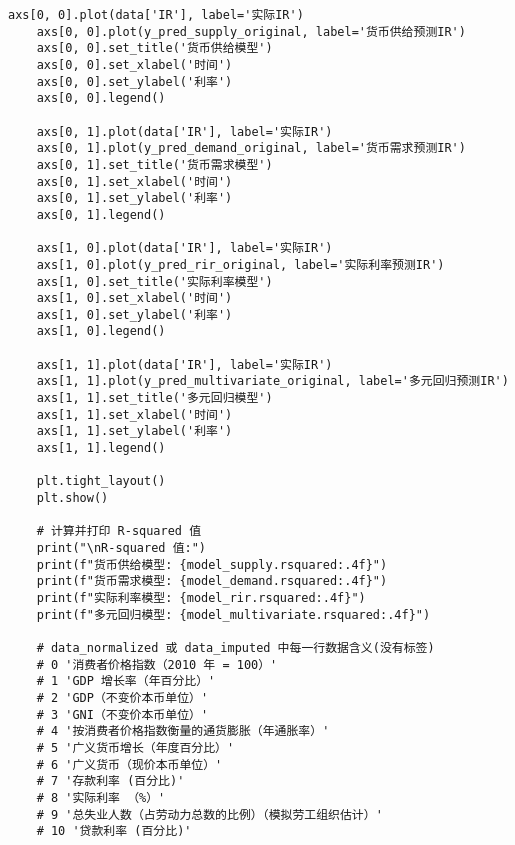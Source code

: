 \begin{lstlisting}[caption={问题二处理代码}]
	axs[0, 0].plot(data['IR'], label='实际IR')
	axs[0, 0].plot(y_pred_supply_original, label='货币供给预测IR')
	axs[0, 0].set_title('货币供给模型')
	axs[0, 0].set_xlabel('时间')
	axs[0, 0].set_ylabel('利率')
	axs[0, 0].legend()
	
	axs[0, 1].plot(data['IR'], label='实际IR')
	axs[0, 1].plot(y_pred_demand_original, label='货币需求预测IR')
	axs[0, 1].set_title('货币需求模型')
	axs[0, 1].set_xlabel('时间')
	axs[0, 1].set_ylabel('利率')
	axs[0, 1].legend()
	
	axs[1, 0].plot(data['IR'], label='实际IR')
	axs[1, 0].plot(y_pred_rir_original, label='实际利率预测IR')
	axs[1, 0].set_title('实际利率模型')
	axs[1, 0].set_xlabel('时间')
	axs[1, 0].set_ylabel('利率')
	axs[1, 0].legend()
	
	axs[1, 1].plot(data['IR'], label='实际IR')
	axs[1, 1].plot(y_pred_multivariate_original, label='多元回归预测IR')
	axs[1, 1].set_title('多元回归模型')
	axs[1, 1].set_xlabel('时间')
	axs[1, 1].set_ylabel('利率')
	axs[1, 1].legend()
	
	plt.tight_layout()
	plt.show()
	
	# 计算并打印 R-squared 值
	print("\nR-squared 值:")
	print(f"货币供给模型: {model_supply.rsquared:.4f}")
	print(f"货币需求模型: {model_demand.rsquared:.4f}")
	print(f"实际利率模型: {model_rir.rsquared:.4f}")
	print(f"多元回归模型: {model_multivariate.rsquared:.4f}")
	
	# data_normalized 或 data_imputed 中每一行数据含义(没有标签)
	# 0 '消费者价格指数（2010 年 = 100）'
	# 1 'GDP 增长率（年百分比）'
	# 2 'GDP（不变价本币单位）'
	# 3 'GNI（不变价本币单位）'
	# 4 '按消费者价格指数衡量的通货膨胀（年通胀率）'
	# 5 '广义货币增长（年度百分比）'
	# 6 '广义货币（现价本币单位）'
	# 7 '存款利率 (百分比)'
	# 8 '实际利率 （%）'
	# 9 '总失业人数（占劳动力总数的比例）（模拟劳工组织估计）'
	# 10 '贷款利率 (百分比)'
	
\end{lstlisting}


